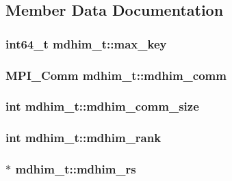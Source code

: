 \subsection{Member Data Documentation}
\hypertarget{structmdhim__t_ad619b3f5abb7fadda7011309865a4a62}{
\subsubsection[{max\-\_\-key}]{\setlength{\rightskip}{0pt plus 5cm}int64\-\_\-t mdhim\-\_\-t\-::max\-\_\-key}}\label{d8/dbc/structmdhim__t_ad619b3f5abb7fadda7011309865a4a62}
\hypertarget{structmdhim__t_a9772a2d123d58e9cd3e4514b860aee97}{
\subsubsection[{mdhim\-\_\-comm}]{\setlength{\rightskip}{0pt plus 5cm}M\-P\-I\-\_\-\-Comm mdhim\-\_\-t\-::mdhim\-\_\-comm}}\label{d8/dbc/structmdhim__t_a9772a2d123d58e9cd3e4514b860aee97}
\hypertarget{structmdhim__t_ab4bf1dd32ae146382cade22a706c1380}{
\subsubsection[{mdhim\-\_\-comm\-\_\-size}]{\setlength{\rightskip}{0pt plus 5cm}int mdhim\-\_\-t\-::mdhim\-\_\-comm\-\_\-size}}\label{d8/dbc/structmdhim__t_ab4bf1dd32ae146382cade22a706c1380}
\hypertarget{structmdhim__t_a501753bb85acfd853c73d3c888714b20}{
\subsubsection[{mdhim\-\_\-rank}]{\setlength{\rightskip}{0pt plus 5cm}int mdhim\-\_\-t\-::mdhim\-\_\-rank}}\label{d8/dbc/structmdhim__t_a501753bb85acfd853c73d3c888714b20}
\hypertarget{structmdhim__t_ae555c224ade4584fcc3895f8ea19a302}{
\subsubsection[{mdhim\-\_\-rs}]{$\ast$ mdhim\-\_\-t\-::mdhim\-\_\-rs}}\label{d8/dbc/structmdhim__t_ae555c224ade4584fcc3895f8ea19a302}
